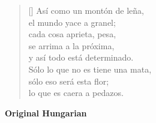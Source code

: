 \documentclass[a4paper,12pt,twoside,final]{book}
\begin{document}
\settowidth{\versewidth}{Sólo lo que no es tiene un arbusto,}

\begin{verse}[\versewidth]
  Así como un montón de leña, \\
  el mundo yace a granel; \\
  cada cosa aprieta, pesa, \\
  se arrima a la próxima, \\
  y así todo está determinado. \\
  Sólo lo que no es tiene una mata, \\
  sólo eso será esta flor; \\
  lo que es caera a pedazos. \\
\end{verse}

\newpage


\noindent \textbf{Original Hungarian}



\settowidth{\versewidth}{Csak ami nincs, annak van bokra,}
\end{document}

